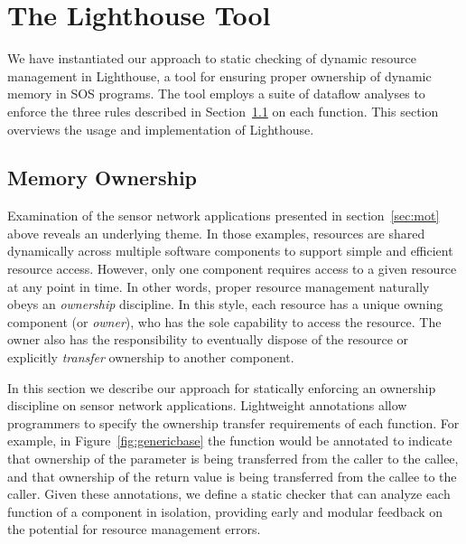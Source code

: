\section{The Lighthouse Tool}
\label{sec:alg}



We have instantiated our approach to static checking of dynamic resource
management in Lighthouse, a tool for ensuring proper ownership of dynamic
memory in SOS programs.
%
The tool employs a suite of dataflow analyses to enforce the three rules
described in Section~\ref{subsec:owner} on each function.
%
This section overviews the usage and implementation of Lighthouse.


\subsection{Memory Ownership}
\label{subsec:owner}

Examination of the sensor network applications presented in
section~\ref{sec:mot} above reveals an underlying theme.  
%
In those examples, resources are shared dynamically across multiple software
components to support simple and efficient resource access.
%
However, only one component requires access to a given resource at any point
in time.  
%
In other words, proper resource management naturally obeys an {\em
ownership} discipline.  
%
In this style, each resource has a unique owning component (or {\em owner}),
who has the sole capability to access the resource.  
%
The owner also has the responsibility to eventually dispose of the resource
or explicitly {\em transfer} ownership to another component.



In this section we describe our approach for statically enforcing an
ownership discipline on sensor network applications.  
%
Lightweight annotations allow programmers to specify the ownership transfer
requirements of each function.  
%
For example, in Figure~\ref{fig:genericbase} the  function
would be annotated to indicate that ownership of the 
parameter is being transferred from the caller to the callee, and that
ownership of the return value is being transferred from the callee to the
caller.  
%
Given these annotations, we define a static checker that can analyze each
function of a component in isolation, providing early and modular feedback
on the potential for resource management errors.




